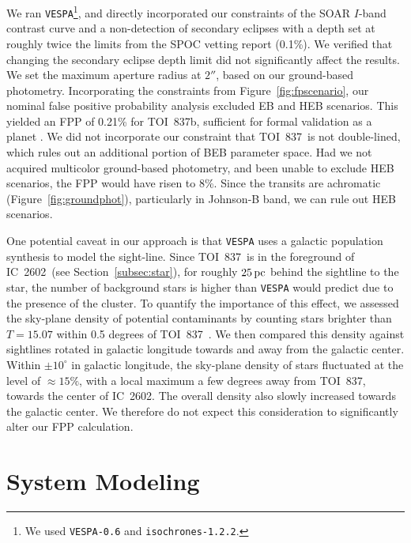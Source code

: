 \documentclass[12pt,twocolumn,tighten]{aastex63}
\newcommand{\tn}{TOI~837} %
\newcommand{\pn}{TOI~837b} %
\newcommand{\cn}{IC~2602} %
\begin{document}
We ran \texttt{VESPA}\footnote{We used \texttt{VESPA-0.6} and
\texttt{isochrones-1.2.2}.}, and directly incorporated our constraints
of the SOAR $I$-band contrast curve and a non-detection of secondary
eclipses with a depth set at roughly twice the limits from the SPOC
vetting report (0.1\%).  We verified that changing the secondary
eclipse depth limit did not significantly affect the results.  We set
the maximum aperture radius at $2''$, based on our ground-based
photometry.  Incorporating the constraints from
Figure~\ref{fig:fpscenario}, our nominal false positive probability
analysis excluded EB and HEB scenarios.  This yielded an FPP of 0.21\%
for \pn, sufficient for formal validation as a planet
\citep{morton_efficient_2012}.  We did not incorporate our constraint
that \tn\ is not double-lined, which rules out an additional portion
of BEB parameter space.  Had we not acquired multicolor ground-based
photometry, and been unable to exclude HEB scenarios, the FPP would
have risen to 8\%.  Since the transits are achromatic
(Figure~\ref{fig:groundphot}), particularly in Johnson-B band, we can
rule out HEB scenarios.

One potential caveat in our approach is that \texttt{VESPA} uses a
galactic population synthesis to model the sight-line. Since \tn\ is
in the foreground of \cn\ (see Section~\ref{subsec:star}), for roughly
$25\,{\rm pc}$ behind the sightline to the star, the number of
background stars is higher than \texttt{VESPA} would predict due to
the presence of the cluster.  To quantify the importance of this
effect, we assessed the sky-plane density of potential contaminants by
counting stars brighter than $T=15.07$ within 0.5 degrees of \tn\
\citep{stassun_TIC8_2019}. We then compared this density against
sightlines rotated in galactic longitude towards and away from the
galactic center. Within $\pm10^\circ$ in galactic longitude, the
sky-plane density of stars fluctuated at the level of $\approx 15\%$,
with a local maximum a few degrees away from \tn, towards the center
of \cn.  The overall density also slowly increased towards the
galactic center.  We therefore do not expect this consideration to
significantly alter our FPP calculation.


\section{System Modeling}
\label{sec:system}
\end{document}
